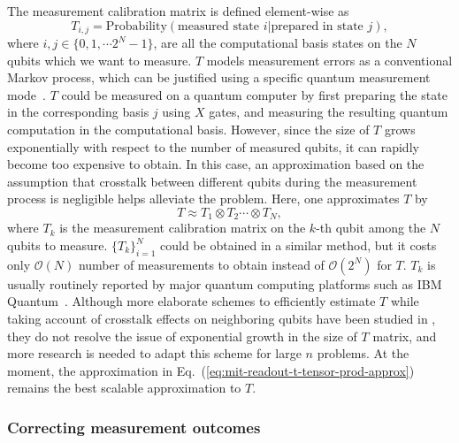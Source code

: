 The measurement calibration matrix is defined element-wise as
\begin{equation}
    T_{i,j} = \text{Probability}\left(\text{measured state }i|\text{prepared in state }j\right),
\end{equation}
where $i,j\in\{0,1,\cdots 2^N-1\}$, are all the computational basis states on the $N$ qubits which we want to measure. $T$ models measurement errors as a conventional Markov process, which can be justified using a specific quantum measurement mode~\cite{gellerRigorousMeasurementError2020}.
$T$ could be measured on a quantum computer by first preparing the state in the corresponding basis $j$ using $X$ gates, and measuring the resulting quantum computation in the computational basis. However, since the size of $T$ grows
exponentially with respect to the number of measured qubits, it can rapidly become too expensive to obtain. In this case, an approximation based on the assumption that crosstalk between different qubits during the measurement process is negligible helps alleviate the problem. Here, one approximates $T$ by
\begin{equation}
    \label{eq:mit-readout-t-tensor-prod-approx}
    T \approx T_1 \otimes T_2 \cdots \otimes T_N,
\end{equation}
where $T_k$ is the measurement calibration matrix on the $k$-th qubit among the $N$ qubits to measure. $\{T_k\}_{i=1}^N$ could be obtained in a similar method, but it costs only $\mathcal{O}(N)$ number of measurements to obtain instead of $\mathcal{O}(2^N)$ for $T$. $T_k$ is usually routinely reported by major quantum computing platforms such as IBM Quantum~\cite{IBMQ}. Although more elaborate schemes to efficiently estimate $T$ while taking account of crosstalk effects on neighboring qubits have been studied in \citet{gellerEfficientCorrectionMultiqubit2020}, they do not resolve the issue of exponential growth in the size of $T$ matrix, and more research is needed to adapt this scheme for large $n$ problems. At the moment, the approximation in Eq.~(\ref{eq:mit-readout-t-tensor-prod-approx}) remains the best scalable approximation to $T$.

\subsubsection{Correcting measurement outcomes}

